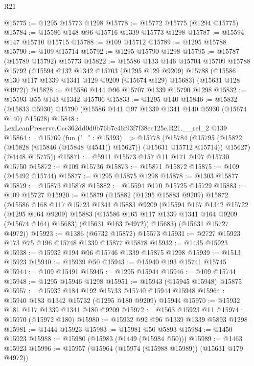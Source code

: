 \begin{lexlean}{R21}
\begin{coremodule}
@15775 := @1295 @15773 @1298
@15778 := @15772 @15775 (@1294 @15775)
@15784 := @15586 @148 @96 @15716 @1339 @15773 @1298
@15787 := @15594 @147 @15710 @15715
@15788 := @109 @15712
@15789 := @1295 @15788
@15790 := @109 @15714
@15792 := @1295 @15790 @1298
@15795 := @15787 (@15789 @15792) @15773
@15822 := @15586
    @133
    @146
    @15704
    @15709
    @15788
    @15792
    (@15594
      @132
      @1342
      @15703
      (@1295 @129 @9209)
      @15788
      (@15586 @130 @117 @1339 @1341 @129 @9209 (@15674 @129) @15683)
      (@15631 @128 @4972))
@15828 := @15586 @144 @96 @15707 @1339 @15790 @1298
@15832 := @15593 @55 @143 @1342 @15706
@15833 := @1295 @140
@15846 := @15832 (@15833 @5930) @15790 (@15586 @141 @97 @1339 @1341 @140 @5930 (@15674 @140) @15628)
@15848 := LexLeanPreserve.Ccc362dd0d0b76b7c46f93f7f38ec125e.R21.__rel_2 @139
@15864 := @15769
    (fun ("_" : @15393) =>
    @15778
      (@15784
        (@15795 (@15822 (@15828 (@15846 (@15848 @4541)) @15627)) (@15631 @15712 @15714))
        @15627)
      (@4448 @15775))
@15871 := @5911 @15573 @157 @11 @171 @197 @15730 @15750
@15872 := @109 @15736
@15873 := @15871 @15872
@15875 := @109 (@15492 @15744)
@15877 := @1295 @15875 @1298
@15878 := @1303 @15877
@15879 := @15873 @15878
@15882 := @15594 @170 @15725 @15729
@15883 := @109 @15727
@15920 := @15879
    (@15882
      (@1295 @15883 @9209)
      @15872
      (@15586
        @168
        @117
        @15723
        @1341
        @15883
        @9209
        (@15594
          @167
          @1342
          @15722
          (@1295 @164 @9209)
          @15883
          (@15586 @165 @117 @1339 @1341 @164 @9209 (@15674 @164) @15683)
          (@15631 @163 @4972))
        @15683)
      (@15631 @15727 @4972))
@15923 := @1386 (@6732 @15872) @15573
@15931 := @2727 @15923 @173 @75 @196 @15748 @1339 @15877 @15878
@15932 := @1435 @15923
@15938 := @15932 @194 @96 @15746 @1339 @15875 @1298
@15939 := @1513 @15923
@15940 := @15939 @50
@15943 := @15940 @193 @15741 @15745
@15944 := @109 @15491
@15945 := @1295 @15944
@15946 := @109 @15744
@15948 := @1295 @15946 @1298
@15951 := @15943 (@15945 @15948) @15875
@15957 := @15932 @184 @192 @15733 @15740 @15944 @15948
@15964 := @15940 @183 @1342 @15732 (@1295 @180 @9209) @15944
@15970 := @15932 @181 @117 @1339 @1341 @180 @9209
@15972 := @1563 @15923 @11
@15974 := @15970 (@15972 @180)
@15980 := @15932 @92 @96 @1339 @1339 @5893 @1298
@15981 := @1444 @15923
@15983 := @15981 @50 @5893
@15984 := @1450 @15923
@15988 := @15980 (@15983 (@1449 (@15984 @50)))
@15989 := @1463 @15923
@15996 := @15957 (@15964 (@15974 (@15988 @15989)) (@15631 @179 @4972))

\end{coremodule}
\end{lexlean}
